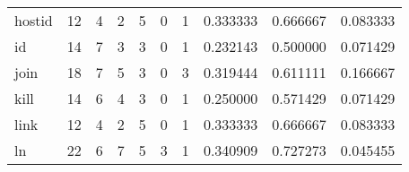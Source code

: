 \begin{tabular}{lrrrrrrrrr}
hostid    &                                      12 &                                                  4 &                                                  2 &                                                  5 &                                                  0 &                                                  1 &                                           0.333333 &                               0.666667 &                             0.083333 \\
id        &                                      14 &                                                  7 &                                                  3 &                                                  3 &                                                  0 &                                                  1 &                                           0.232143 &                               0.500000 &                             0.071429 \\
join      &                                      18 &                                                  7 &                                                  5 &                                                  3 &                                                  0 &                                                  3 &                                           0.319444 &                               0.611111 &                             0.166667 \\
kill      &                                      14 &                                                  6 &                                                  4 &                                                  3 &                                                  0 &                                                  1 &                                           0.250000 &                               0.571429 &                             0.071429 \\
link      &                                      12 &                                                  4 &                                                  2 &                                                  5 &                                                  0 &                                                  1 &                                           0.333333 &                               0.666667 &                             0.083333 \\
ln        &                                      22 &                                                  6 &                                                  7 &                                                  5 &                                                  3 &                                                  1 &                                           0.340909 &                               0.727273 &                             0.045455 \\

\end{tabular}
